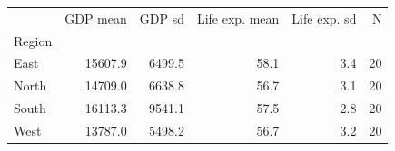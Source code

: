 \begin{tabular}{lrrrrr}
\toprule
 & GDP mean & GDP sd & Life exp. mean & Life exp. sd & N \\
Region &  &  &  &  &  \\
\midrule
East & 15607.9 & 6499.5 & 58.1 & 3.4 & 20 \\
North & 14709.0 & 6638.8 & 56.7 & 3.1 & 20 \\
South & 16113.3 & 9541.1 & 57.5 & 2.8 & 20 \\
West & 13787.0 & 5498.2 & 56.7 & 3.2 & 20 \\
\bottomrule
\end{tabular}
